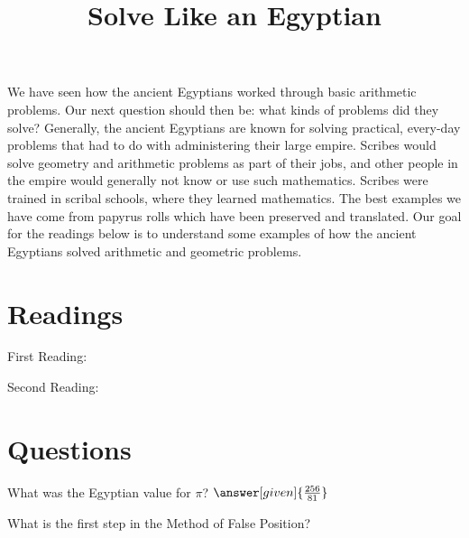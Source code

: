 \documentclass{ximera}
\title{Solve Like an Egyptian}
\begin{document}
\begin{abstract}
\end{abstract}
\maketitle



We have seen how the ancient Egyptians worked through basic arithmetic problems.  Our next question should then be: what kinds of problems did they solve?  Generally, the ancient Egyptians are known for solving practical, every-day problems that had to do with administering their large empire.  Scribes would solve geometry and arithmetic problems as part of their jobs, and other people in the empire would generally not know or use such mathematics.  Scribes were trained in scribal schools, where they learned mathematics.  The best examples we have come from papyrus rolls which have been preserved and translated.  Our goal for the readings below is to understand some examples of how the ancient Egyptians solved arithmetic and geometric problems.



\section{Readings}

First Reading: 

Second Reading: 



\section{Questions}

\begin{question}
What was the Egyptian value for $\pi$? $\answer[given]{\frac{256}{81}}$
\end{question}

\begin{question}
What is the first step in the Method of False Position?
\begin{multipleChoice}
\end{multipleChoice}
\end{question}


\end{document}
